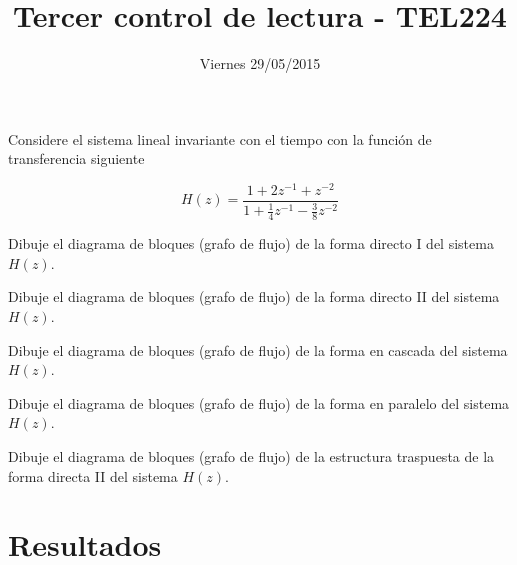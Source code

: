 \documentclass[addpoints]{exam}
\begin{document}
\headrule

\title{Tercer control de lectura - TEL224}
\date{Viernes 29/05/2015}
\maketitle

\vspace{0.1in}
\vspace{0.1in}

Considere el sistema lineal invariante con el tiempo con la función de transferencia siguiente

$$H(z) = \frac{1 + 2 z^{-1} + z^{-2}}{1 + \frac{1}{4} z^{-1} -\frac{3}{8} z^{-2}}$$

\begin{questions}

\question[20]

Dibuje el diagrama de bloques (grafo de flujo) de la forma directo I del sistema \(H(z)\).

\question[20]


Dibuje el diagrama de bloques (grafo de flujo) de la forma directo II del sistema \(H(z)\).

\newpage
\question[20]

Dibuje el diagrama de bloques (grafo de flujo) de la forma en cascada del sistema \(H(z)\).

\question[20]

Dibuje el diagrama de bloques (grafo de flujo) de la forma en paralelo del sistema \(H(z)\).

\newpage
\question[20]

Dibuje el diagrama de bloques (grafo de flujo) de la estructura traspuesta de la forma directa II del sistema \(H(z)\).


\end{questions}

\section*{Resultados}

\begin{center}
\gradetable[v][questions]
\end{center}

\footrule
{}
\end{document}
